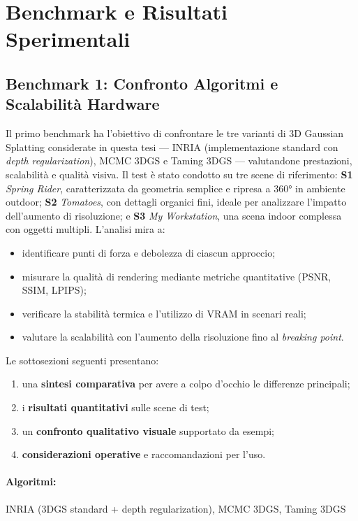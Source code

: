 \section{Benchmark e Risultati Sperimentali}
\label{sec:benchmark_risultati}

\subsection{Benchmark 1: Confronto Algoritmi e Scalabilità Hardware}
\label{subsec:benchmark1_sintetico}

Il primo benchmark ha l’obiettivo di confrontare le tre varianti di 3D Gaussian Splatting considerate in questa tesi — INRIA (implementazione standard con \textit{depth regularization}), MCMC 3DGS e Taming 3DGS — valutandone prestazioni, scalabilità e qualità visiva. 
Il test è stato condotto su tre scene di riferimento: \textbf{S1} \textit{Spring Rider}, caratterizzata da geometria semplice e ripresa a 360° in ambiente outdoor; \textbf{S2} \textit{Tomatoes}, con dettagli organici fini, ideale per analizzare l’impatto dell’aumento di risoluzione; e \textbf{S3} \textit{My Workstation}, una scena indoor complessa con oggetti multipli.
\newpage
L’analisi mira a:
\begin{itemize}
	\item identificare punti di forza e debolezza di ciascun approccio;
	\item misurare la qualità di rendering mediante metriche quantitative (PSNR, SSIM, LPIPS);
	\item verificare la stabilità termica e l’utilizzo di VRAM in scenari reali;
	\item valutare la scalabilità con l’aumento della risoluzione fino al \textit{breaking point}.
\end{itemize}

Le sottosezioni seguenti presentano:
\begin{enumerate}
	\item una \textbf{sintesi comparativa} per avere a colpo d’occhio le differenze principali;
	\item i \textbf{risultati quantitativi} sulle scene di test;
	\item un \textbf{confronto qualitativo visuale} supportato da esempi;
	\item \textbf{considerazioni operative} e raccomandazioni per l’uso.
\end{enumerate}


\paragraph{Algoritmi:} INRIA (3DGS standard + depth regularization), MCMC 3DGS, Taming 3DGS \\

